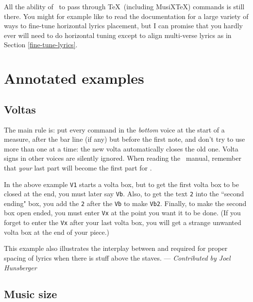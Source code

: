 \documentclass[11pt]{article}
\begin{document}
All the ability of \PMX\ to pass through \TeX\ (including MusiX\TeX) 
commands is still there.   You might for example like to read the 
 documentation for a large variety of ways to 
fine-tune horizontal lyrics placement, but I can promise that you hardly 
ever will need to do horizontal tuning except to align multi-verse lyrics as 
in Section \ref{fine-tune-lyrics}.


\pagebreak
\section{Annotated examples}
 \subsection{Voltas} \label{voltas}
 \hskip -12mm
\begin{mus}
 
\end{mus}

The main rule is: put every  command in the \emph{bottom} voice
at the start of a measure,
after the bar line (if any) but before the first note, and don't try
to use more than one at a time: the new volta automatically closes the
old one.  Volta signs in other voices are silently ignored.
When reading the \PMX\ manual, remember that \emph{your} last part will 
become the first part for \PMX. 

In the above example \texttt{V1} starts a volta box, 
but to get the first volta box to be closed at the end, you must later
say \texttt{Vb}.  Also, to get the text \texttt{2} into the ``second ending" 
box, you add the \texttt{2}
after the \texttt{Vb} to make \verb"Vb2".  Finally, to make the second 
box open ended, you must enter \texttt{Vx} at the point you want it to be 
done.  (If you forget to enter the \texttt{Vx} after your last volta box, you 
will get a strange unwanted volta box at the end of your piece.)  

This example also illustrates the interplay between 
and \ixem{\atsign} required for proper spacing of lyrics when there
is stuff above the staves.
\hfill --- \textsl{Contributed by Joel Hunsberger}

\subsection{Music size} \label{sizes}


\begin{center}
\begin{mus}
 
\end{mus}
\end{center}
\end{document}
